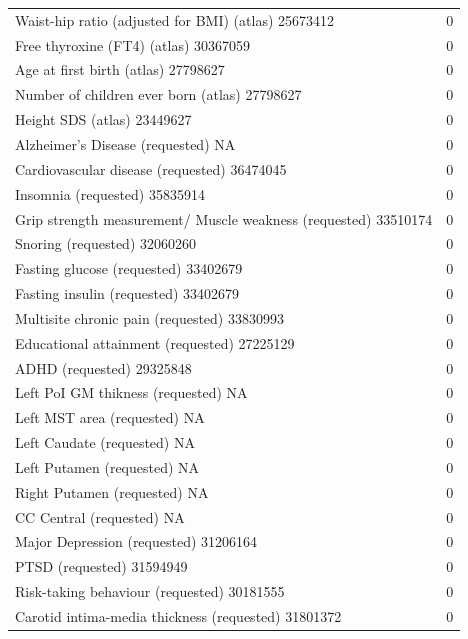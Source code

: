 \begin{table}[ht]
\begin{tabular}{lr}
  Waist-hip ratio (adjusted for BMI) (atlas) 25673412 &   0 \\ 
  Free thyroxine (FT4) (atlas) 30367059 &   0 \\ 
  Age at first birth  (atlas) 27798627 &   0 \\ 
  Number of children ever born  (atlas) 27798627 &   0 \\ 
  Height SDS (atlas) 23449627 &   0 \\ 
  Alzheimer's Disease (requested) NA &   0 \\ 
  Cardiovascular disease (requested) 36474045 &   0 \\ 
  Insomnia (requested) 35835914 &   0 \\ 
  Grip strength measurement/ Muscle weakness (requested) 33510174 &   0 \\ 
  Snoring (requested) 32060260 &   0 \\ 
  Fasting glucose (requested) 33402679 &   0 \\ 
  Fasting insulin (requested) 33402679 &   0 \\ 
  Multisite chronic pain (requested) 33830993 &   0 \\ 
  Educational attainment (requested) 27225129 &   0 \\ 
  ADHD (requested) 29325848 &   0 \\ 
  Left PoI GM thikness (requested) NA &   0 \\ 
  Left MST area (requested) NA &   0 \\ 
  Left Caudate (requested) NA &   0 \\ 
  Left Putamen (requested) NA &   0 \\ 
  Right Putamen (requested) NA &   0 \\ 
  CC Central (requested) NA &   0 \\ 
  Major Depression (requested) 31206164 &   0 \\ 
  PTSD (requested) 31594949 &   0 \\ 
  Risk-taking behaviour (requested) 30181555 &   0 \\ 
  Carotid intima-media thickness (requested) 31801372 &   0 \\ 
   \hline
\end{tabular}
\end{table}
